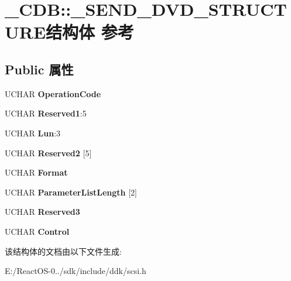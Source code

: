 \hypertarget{struct___c_d_b_1_1___s_e_n_d___d_v_d___s_t_r_u_c_t_u_r_e}{}\section{\+\_\+\+C\+DB\+:\+:\+\_\+\+S\+E\+N\+D\+\_\+\+D\+V\+D\+\_\+\+S\+T\+R\+U\+C\+T\+U\+R\+E结构体 参考}
\label{struct___c_d_b_1_1___s_e_n_d___d_v_d___s_t_r_u_c_t_u_r_e}
\subsection*{Public 属性}
\begin{DoxyCompactItemize}
\item 
\mbox{\label{struct___c_d_b_1_1___s_e_n_d___d_v_d___s_t_r_u_c_t_u_r_e_a653d1225cd0d14480018c446e4bd43a1}} 
U\+C\+H\+AR {\bfseries Operation\+Code}
\item 
\mbox{\label{struct___c_d_b_1_1___s_e_n_d___d_v_d___s_t_r_u_c_t_u_r_e_a5b0449b57cb45f7a8102217cc8a88210}} 
U\+C\+H\+AR {\bfseries Reserved1}\+:5
\item 
\mbox{\label{struct___c_d_b_1_1___s_e_n_d___d_v_d___s_t_r_u_c_t_u_r_e_a376d601742e816650bf772659034a6ee}} 
U\+C\+H\+AR {\bfseries Lun}\+:3
\item 
\mbox{\label{struct___c_d_b_1_1___s_e_n_d___d_v_d___s_t_r_u_c_t_u_r_e_abfce0b84a279d10e661091ff26d86333}} 
U\+C\+H\+AR {\bfseries Reserved2} \mbox{[}5\mbox{]}
\item 
\mbox{\label{struct___c_d_b_1_1___s_e_n_d___d_v_d___s_t_r_u_c_t_u_r_e_a1dcf6ea1a57baf38c6c9e88529862ccc}} 
U\+C\+H\+AR {\bfseries Format}
\item 
\mbox{\label{struct___c_d_b_1_1___s_e_n_d___d_v_d___s_t_r_u_c_t_u_r_e_a0454991dbfa03778381221ee2b3226b8}} 
U\+C\+H\+AR {\bfseries Parameter\+List\+Length} \mbox{[}2\mbox{]}
\item 
\mbox{\label{struct___c_d_b_1_1___s_e_n_d___d_v_d___s_t_r_u_c_t_u_r_e_a0bec1ba9350a13cbf805c29c84d2e28c}} 
U\+C\+H\+AR {\bfseries Reserved3}
\item 
\mbox{\label{struct___c_d_b_1_1___s_e_n_d___d_v_d___s_t_r_u_c_t_u_r_e_a3fb876cbb792f9f539ed98d3ca10073a}} 
U\+C\+H\+AR {\bfseries Control}
\end{DoxyCompactItemize}


该结构体的文档由以下文件生成\+:\begin{DoxyCompactItemize}
\item 
E\+:/\+React\+O\+S-\/0../sdk/include/ddk/scsi.\+h\end{DoxyCompactItemize}

